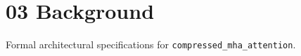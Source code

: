 \section{03 Background}

Formal architectural specifications for \texttt{compressed_mha_attention}.
